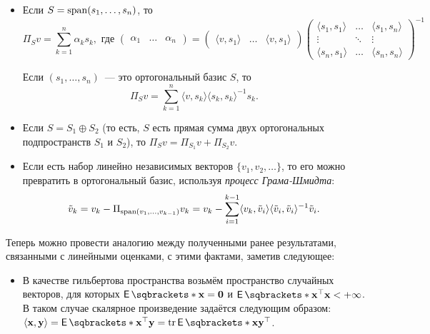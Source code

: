 \begin{leftbar}
\begin{small}
\begin{itemize}
		\item Если \(S = \operatorname{span}(s_{1}, \ldots, s_{n})\), то 
		\[
			\Pi_{S}v = \sum_{k = 1}^{n}\alpha_{k}s_{k}, \text{ где }
			\begin{pmatrix}
			\alpha_{1} & \ldots & \alpha_{n}
			\end{pmatrix}
			=
			\begin{pmatrix}
			\langle v, s_{1} \rangle & \ldots & \langle v, s_{1} \rangle
			\end{pmatrix}
			\begin{pmatrix}
			\langle s_{1}, s_{1} \rangle & \ldots & \langle s_{1}, s_{n} 
			\rangle \\
			\vdots & \ddots & \vdots \\
			\langle s_{n}, s_{1} \rangle & \ldots & \langle s_{n}, s_{n} \rangle
			\end{pmatrix}^{-1}
		\]
		
		Если \((s_{1}, \ldots, s_{n})\)~--- это ортогональный базис \(S\), то
		\[
			\Pi_{S}v = \sum_{k = 1}^{n}\langle v, s_{k} \rangle \langle s_{k}, 
			s_{k} \rangle^{-1}s_{k}.
		\]
		
		\item Если \(S = S_{1} \oplus S_{2}\) (то есть, \(S\) есть прямая сумма 
		двух ортогональных подпространств \(S_{1}\) и \(S_{2}\)), то \(\Pi_{S}v 
		= \Pi_{S_{1}}v + \Pi_{S_{2}}v\).
		
		\item Если есть набор линейно независимых векторов \(\{v_{1}, v_{2}, 
		\ldots\}\), то его можно превратить в ортогональный базис, используя 
		\emph{процесс Грама-Шмидта}:
		\[
			\tilde{v}_{k} = v_{k} - \Pi_{\operatorname{span}(v_{1}, \ldots, v_{k - 
			1})}v_{k} = v_{k} - \sum_{i = 1}^{k - 1}\langle v_{k}, 
			\tilde{v}_{i}\rangle \langle \tilde{v}_{i}, 
			\tilde{v}_{i}\rangle^{-1} \tilde{v}_{i}.
		\]
	\end{itemize}

	Теперь можно провести аналогию между полученными ранее результатами, 
	связанными с линейными оценками, с этими фактами, заметив следующее:
	\begin{itemize}
		\item В качестве гильбертова пространства возьмём пространство 
		случайных векторов, для которых \(\E{\mathbf{x}} = \mathbf{0}\) и 
		\(\E{\mathbf{x}^{\top}\mathbf{x}} < +\infty\). В таком случае скалярное 
		произведение задаётся следующим образом: \(\langle \mathbf{x}, 
		\mathbf{y} \rangle = \E{\mathbf{x}^{\top}\mathbf{y}} = 
		\tr{\E{\mathbf{x}\mathbf{y}^{\top}}}\).
		

\end{itemize}
\end{small}
\end{leftbar}
